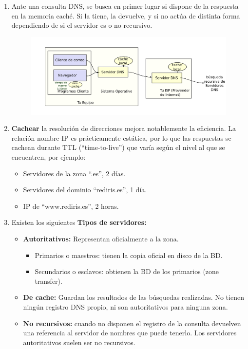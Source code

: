 \begin{enumerate}
    \item Ante una consulta DNS, se busca en primer lugar si dispone de la respuesta en la memoria caché. Si la tiene, la devuelve, y si no actúa de distinta forma dependiendo de si el servidor es o no recursivo.
    \begin{figure}[H]\centering\includegraphics[width=\textwidth]{img/DNS_Busqueda.png}\end{figure}
    \item \textbf{Cachear} la resolución de direcciones mejora notablemente la eficiencia. La relación nombre-IP es prácticamente estática, por lo que las respuestas se cachean durante TTL (“time-to-live”) que varía según el nivel al que se encuentren, por ejemplo:
    \begin{itemize}
        \item Servidores de la zona \enquote{.es}, 2 días.
        \item Servidores del dominio \enquote{rediris.es}, 1 día.
        \item IP de \enquote{www.rediris.es}, 2 horas.
    \end{itemize}
    \item Existen los siguientes \textbf{Tipos de servidores:}
    \begin{itemize}
        \item \textbf{Autoritativos: }Representan oficialmente a la zona.
        \begin{itemize}
            \item Primarios o maestros: tienen la copia oficial en disco de la BD.
            \item Secundarios o esclavos: obtienen la BD de los primarios (zone transfer).
        \end{itemize}
        \item \textbf{De cache: }Guardan los resultados de las búsquedas realizadas. No tienen ningún registro DNS propio, ni son autoritativos para ninguna zona.
        \item \textbf{No recursivos: }cuando no disponen el registro de la consulta devuelven una referencia al servidor de nombres que puede tenerlo. Los servidores autoritativos suelen ser no recursivos.

\end{itemize}
\end{enumerate}
